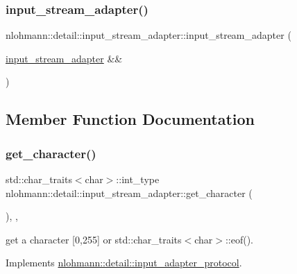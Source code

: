 \subsubsection{\texorpdfstring{input\_stream\_adapter()}{input\_stream\_adapter()}\hspace{0.1cm}{\footnotesize\ttfamily [3/3]}}
{\footnotesize\ttfamily nlohmann\+::detail\+::input\+\_\+stream\+\_\+adapter\+::input\+\_\+stream\+\_\+adapter (\begin{DoxyParamCaption}\item[{\mbox{\hyperlink{classnlohmann_1_1detail_1_1input__stream__adapter}{input\+\_\+stream\+\_\+adapter}} \&\&}]{ }\end{DoxyParamCaption})\hspace{0.3cm}{\ttfamily [delete]}}



\subsection{Member Function Documentation}
\mbox{\label{classnlohmann_1_1detail_1_1input__stream__adapter_ae0760af923583de6354725e901d1869d}} 
\subsubsection{\texorpdfstring{get\_character()}{get\_character()}}
{\footnotesize\ttfamily std\+::char\+\_\+traits$<$char$>$\+::int\+\_\+type nlohmann\+::detail\+::input\+\_\+stream\+\_\+adapter\+::get\+\_\+character (\begin{DoxyParamCaption}{ }\end{DoxyParamCaption})\hspace{0.3cm}{\ttfamily [inline]}, {\ttfamily [override]}, {\ttfamily [virtual]}}



get a character \mbox{[}0,255\mbox{]} or std\+::char\+\_\+traits$<$char$>$\+::eof(). 



Implements \mbox{\hyperlink{structnlohmann_1_1detail_1_1input__adapter__protocol_aac10a6a4048a8ce8e2ed50277692a3ca}{nlohmann\+::detail\+::input\+\_\+adapter\+\_\+protocol}}.

